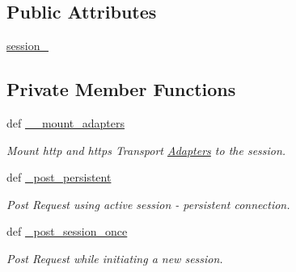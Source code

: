 \subsection*{Public Attributes}
\begin{DoxyCompactItemize}
\item 
\hyperlink{classRappCloud_1_1ServiceController_1_1ServiceControllerBase_1_1ServiceControllerBase_a10a417e6895d6266493e9d2369d14fb4}{session\-\_\-}
\end{DoxyCompactItemize}
\subsection*{Private Member Functions}
\begin{DoxyCompactItemize}
\item 
def \hyperlink{classRappCloud_1_1ServiceController_1_1ServiceControllerBase_1_1ServiceControllerBase_aeced30397e0945171d1a443b681b8335}{\-\_\-\-\_\-mount\-\_\-adapters}
\begin{DoxyCompactList}\small\item\em Mount http and https Transport \hyperlink{namespaceRappCloud_1_1ServiceController_1_1Adapters}{Adapters} to the session. \end{DoxyCompactList}\item 
def \hyperlink{classRappCloud_1_1ServiceController_1_1ServiceControllerBase_1_1ServiceControllerBase_a55b15ec29942ac811e8a6d108682fc7f}{\-\_\-post\-\_\-persistent}
\begin{DoxyCompactList}\small\item\em Post Request using active session -\/ persistent connection. \end{DoxyCompactList}\item 
def \hyperlink{classRappCloud_1_1ServiceController_1_1ServiceControllerBase_1_1ServiceControllerBase_aeed65d159bcedf2fe41074237fbad5f8}{\-\_\-post\-\_\-session\-\_\-once}
\begin{DoxyCompactList}\small\item\em Post Request while initiating a new session. \end{DoxyCompactList}\end{DoxyCompactItemize}
